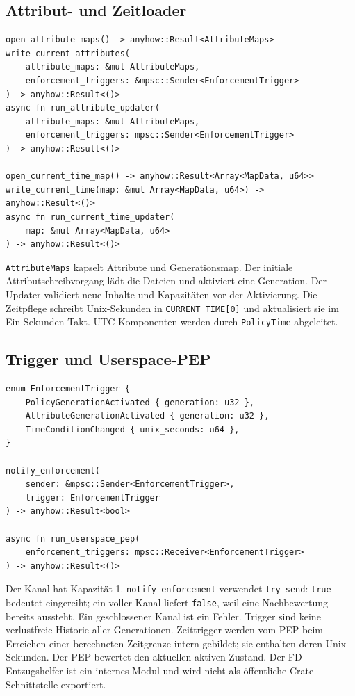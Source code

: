 \documentclass[12pt,a4paper]{article}
\begin{document}
\subsection{Attribut- und Zeitloader}
\begin{lstlisting}
open_attribute_maps() -> anyhow::Result<AttributeMaps>
write_current_attributes(
    attribute_maps: &mut AttributeMaps,
    enforcement_triggers: &mpsc::Sender<EnforcementTrigger>
) -> anyhow::Result<()>
async fn run_attribute_updater(
    attribute_maps: &mut AttributeMaps,
    enforcement_triggers: mpsc::Sender<EnforcementTrigger>
) -> anyhow::Result<()>

open_current_time_map() -> anyhow::Result<Array<MapData, u64>>
write_current_time(map: &mut Array<MapData, u64>) -> anyhow::Result<()>
async fn run_current_time_updater(
    map: &mut Array<MapData, u64>
) -> anyhow::Result<()>
\end{lstlisting}
\texttt{AttributeMaps} kapselt Attribute und Generationsmap. Der initiale
Attributschreibvorgang lädt die Dateien und aktiviert eine Generation.
Der Updater validiert neue Inhalte und Kapazitäten vor der Aktivierung.
Die Zeitpflege schreibt Unix-Sekunden in \texttt{CURRENT\_TIME[0]} und aktualisiert
sie im Ein-Sekunden-Takt. UTC-Komponenten werden durch \texttt{PolicyTime} abgeleitet.

\subsection{Trigger und Userspace-PEP}
\begin{lstlisting}
enum EnforcementTrigger {
    PolicyGenerationActivated { generation: u32 },
    AttributeGenerationActivated { generation: u32 },
    TimeConditionChanged { unix_seconds: u64 },
}

notify_enforcement(
    sender: &mpsc::Sender<EnforcementTrigger>,
    trigger: EnforcementTrigger
) -> anyhow::Result<bool>

async fn run_userspace_pep(
    enforcement_triggers: mpsc::Receiver<EnforcementTrigger>
) -> anyhow::Result<()>
\end{lstlisting}
Der Kanal hat Kapazität 1. \texttt{notify\_enforcement} verwendet
\texttt{try\_send}: \texttt{true} bedeutet eingereiht; ein voller Kanal liefert
\texttt{false}, weil eine Nachbewertung bereits aussteht. Ein geschlossener Kanal
ist ein Fehler. Trigger sind keine verlustfreie Historie aller Generationen.
Zeittrigger werden vom PEP beim Erreichen einer berechneten Zeitgrenze intern
gebildet; sie enthalten deren Unix-Sekunden. Der PEP bewertet den aktuellen
aktiven Zustand. Der FD-Entzugshelfer ist ein
internes Modul und wird nicht als öffentliche Crate-Schnittstelle exportiert.
\end{document}
